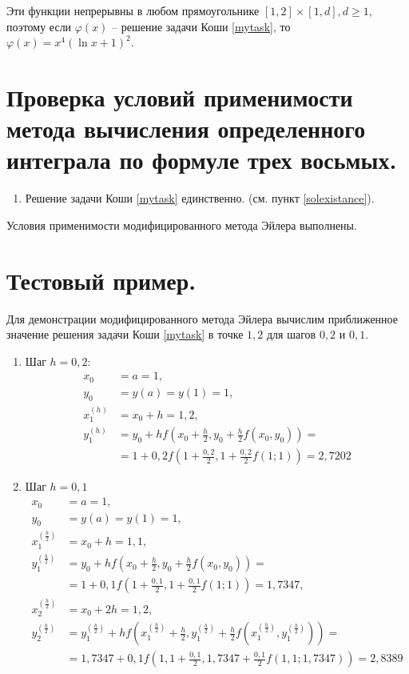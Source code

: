 \documentclass[a4paper, 12pt]{article}
\begin{document}
	Эти функции непрерывны в любом прямоугольнике $[1,2]\times[1,d], d\geq1$, поэтому если $\varphi(x)$ -- решение задачи Коши \eqref{mytask}, то $\varphi(x)=x^4(\ln x+1)^2$.
	
	\section{Проверка условий применимости метода вычисления определенного интеграла по формуле трех восьмых.}
	
	\begin{enumerate}
		\item Решение задачи Коши \eqref{mytask} единственно. (см. пункт \ref{solexistance}).
	\end{enumerate}

	Условия применимости модифицированного метода Эйлера выполнены.
	
	\section{Тестовый пример.}
	
	Для демонстрации модифицированного метода Эйлера вычислим приближенное значение решения задачи Коши \eqref{mytask} в точке $1,2$ для шагов $0,2$ и $0,1$.
	
	\begin{enumerate}
		\item Шаг $h=0,2$:
			\begin{equation*}
				\begin{aligned}
					x_0&=a=1,\\
					y_0&=y(a)=y(1)=1,\\
					x_1^{(h)}&=x_0+h=1,2,\\
					y_1^{(h)}&=y_0+hf(x_0+\frac{h}{2},y_0+\frac{h}{2}f(x_0,y_0))=\\&=1+0,2f(1+\frac{0,2}{2},1+\frac{0,2}{2}f(1;1))=2,7202
				\end{aligned}
			\end{equation*}	
		\item Шаг $h=0,1$
			\begin{equation*}
				\begin{aligned}
					x_0&=a=1,\\
					y_0&=y(a)=y(1)=1,\\
					x_1^{(\frac{h}{2})}&=x_0+h=1,1,\\
					y_1^{(\frac{h}{2})}&=y_0+hf(x_0+\frac{h}{2},y_0+\frac{h}{2}f(x_0,y_0))=\\&=1+0,1f(1+\frac{0,1}{2},1+\frac{0,1}{2}f(1;1))=1,7347,\\
					x_2^{(\frac{h}{2})}&=x_0+2h=1,2,\\
					y_2^{(\frac{h}{2})}&=y_1^{(\frac{h}{2})}+hf(x_1^{(\frac{h}{2})}+\frac{h}{2},y_1^{(\frac{h}{2})}+\frac{h}{2}f(x_1^{(\frac{h}{2})},y_1^{(\frac{h}{2})}))=\\&=1,7347+0,1f(1,1+\frac{0,1}{2},1,7347+\frac{0,1}{2}f(1,1;1,7347))=2,8389
				\end{aligned}
			\end{equation*}
	\end{enumerate} 
\end{document}
